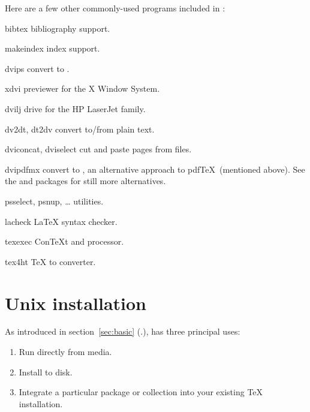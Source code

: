 \documentclass{article}
\begin{document}
Here are a few other commonly-used programs included in \TL{}:

\begin{cmddescription}

\item [bibtex] bibliography support.

\item [makeindex] index support.

\item [dvips] convert \dvi{} to \PS{}.

\item [xdvi] \dvi{} previewer for the X Window System.

\item [dvilj] \dvi{} drive for the HP LaserJet family.

\item [dv2dt, dt2dv] convert \dvi{} to/from plain text.

\item [dviconcat, dviselect] cut and paste pages
from \dvi{} files.

\item [dvipdfmx] convert \dvi{} to , an alternative approach
to pdf\TeX\ (mentioned above).  See the  and
 packages for still more alternatives.

\item [psselect, psnup, \ldots] \PS{}
utilities.

\item [lacheck] \LaTeX{} syntax checker.

\item [texexec] Con\TeX{}t and  processor.

\item [tex4ht] \TeX{} to  converter.  

\end{cmddescription}


\section{Unix installation}
\label{sec:unix-install}

As introduced in section~\ref{sec:basic} (\p.\pageref{sec:basic}),
\TL{} has three principal uses:

\begin{enumerate}
\item Run directly from media.
\item Install to disk.
\item Integrate a particular package or collection into your existing
\TeX{} installation.
\end{enumerate}
\end{document}
